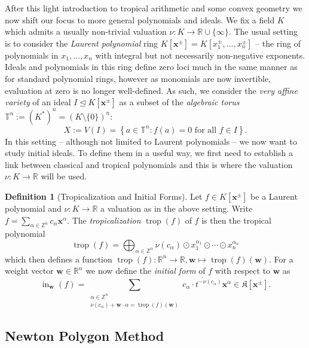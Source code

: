 \documentclass[
  paper=a4,
  DIV=14,
  fontsize=12pt,
  titlepage,
  bibliography=totoc,
  listof=totoc,
  pagesize=pdftex
]{scrartcl}
\numberwithin{figure}{section}
\numberwithin{equation}{section}
\numberwithin{table}{section}
\newcommand*\setZ{\mathds{Z}}
\newcommand*\setR{\mathds{R}}
\newcommand*\setT{\mathds{T}}
\let\vec\mathbf
\let\idealof\trianglelefteq
\DeclareMathOperator{\trop}{trop}
\DeclareMathOperator{\initial}{in}
\theoremstyle{definition}
\newtheorem{definition}{Definition}
\numberwithin{definition}{section}
\begin{document}
After this light introduction to tropical arithmetic and some convex geometry we now shift
our focus to more general polynomials and ideals. We fix a field $K$ which admits a
usually non-trivial valuation $\nu : K \to \setR \cup \{\infty\}$. The usual setting is to
consider the \emph{Laurent polynomial} ring $K[\vec x^\pm] = K[x_1^\pm, \dots, x_n^\pm]$
-- the ring of polynomials in $x_1, \dots, x_n$ with integral but not necessarily
non-negative exponents. Ideals and polynomials in this ring define zero loci much in the
same manner as for standard polynomial rings, however as monomials are now invertible,
evaluation at zero is no longer well-defined. As such, we consider the \emph{very affine
variety} of an ideal $I \idealof K[\vec x^\pm]$ as a subset of the \emph{algebraic torus}
$\setT^n := {(K^*)}^n = {(K \setminus \{0\})}^n$:
\[
  X := V(I) = \left\{ a \in \setT^n : f(a) = 0 \text{ for all $f \in I$} \right\}.
\]
In this setting -- although not limited to Laurent polynomials -- we now want to study
initial ideals. To define them in a useful way, we first need to establish a link between
classical and tropical polynomials and this is where the valuation $\nu:K\to\setR$ will be
used.

\begin{definition}[Tropicalization and Initial Forms]
  Let $f \in K[\vec x^\pm]$ be a Laurent polynomial and $\nu : K \to \setR$ a valuation as
  in the above setting. Write $f = \sum_{\alpha \in \setZ^n} c_\alpha \vec x^\alpha$. The
  \emph{tropicalization} $\trop(f)$ of $f$ is then the tropical polynomial
  \[
    \trop(f) = \bigoplus_{\alpha\in\setZ^\alpha} \nu(c_\alpha)
    \odot x_1^{\alpha_1}\odot\cdots \odot x_n^{\alpha_n}
  \]
  which then defines a function $\trop(f) : \setR^n \to \setR, \vec w \mapsto
  \trop(f)(\vec w)$. For a weight vector $\vec w \in \setR^n$ we now define the
  \emph{initial form} of $f$ with respect to $\vec w$ as
  \[
    \initial_{\vec w}(f) =
    \sum_{ \substack{
        \alpha \in \setZ^n \\
        \nu(c_\alpha) + \vec w\cdot \alpha = \trop(f)(\vec w)
    }} \overline {c_\alpha \cdot t^{-\nu(c_\alpha)} } \vec x^\alpha
    \in \mathfrak K[\vec x^\pm].
  \]
  \label{def:initialId}
\end{definition}


\subsection{Newton Polygon Method}
\end{document}
